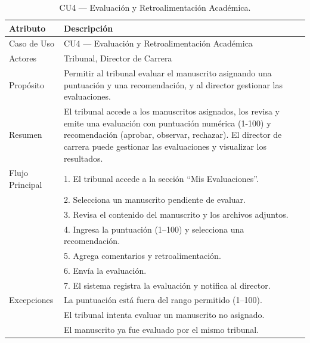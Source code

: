 \begin{table}[H]
\centering
\caption{CU4 — Evaluación y Retroalimentación Académica.}
\label{tab:cu4}
\begin{tabular}{lp{10cm}}
\toprule
\textbf{Atributo} & \textbf{Descripción} \\
\midrule
Caso de Uso & CU4 — Evaluación y Retroalimentación Académica \\
Actores & Tribunal, Director de Carrera \\
Propósito & Permitir al tribunal evaluar el manuscrito asignando una puntuación y una recomendación, y al director gestionar las evaluaciones. \\
Resumen & El tribunal accede a los manuscritos asignados, los revisa y emite una evaluación con puntuación numérica (1-100) y recomendación (aprobar, observar, rechazar). El director de carrera puede gestionar las evaluaciones y visualizar los resultados. \\
Flujo Principal & 1. El tribunal accede a la sección ``Mis Evaluaciones''. \\
& 2. Selecciona un manuscrito pendiente de evaluar. \\
& 3. Revisa el contenido del manuscrito y los archivos adjuntos. \\
& 4. Ingresa la puntuación (1--100) y selecciona una recomendación. \\
& 5. Agrega comentarios y retroalimentación. \\
& 6. Envía la evaluación. \\
& 7. El sistema registra la evaluación y notifica al director. \\
Excepciones & La puntuación está fuera del rango permitido (1--100). \\
& El tribunal intenta evaluar un manuscrito no asignado. \\
& El manuscrito ya fue evaluado por el mismo tribunal. \\
\bottomrule
\end{tabular}
\end{table}

